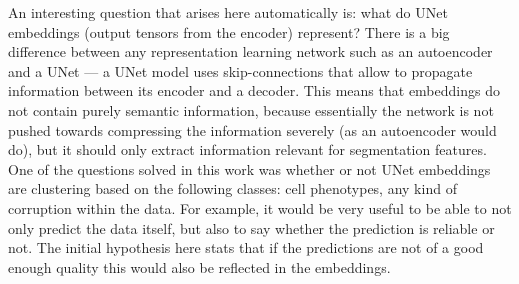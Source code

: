 An interesting question that arises here automatically is: what do UNet embeddings (output tensors from the encoder) represent? There is a big difference between any representation learning network such as an autoencoder and a UNet --- a UNet model uses skip-connections that allow to propagate information between its encoder and a decoder. This means that embeddings do not contain purely semantic information, because essentially the network is not pushed towards compressing the information severely (as an autoencoder would do), but it should only extract information relevant for segmentation features. One of the questions solved in this work was whether or not UNet embeddings are clustering based on the following classes: cell phenotypes, any kind of corruption within the data. For example, it would be very useful to be able to not only predict the data itself, but also to say whether the prediction is reliable or not. The initial hypothesis here stats that if the predictions are not of a good enough quality this would also be reflected in the embeddings.